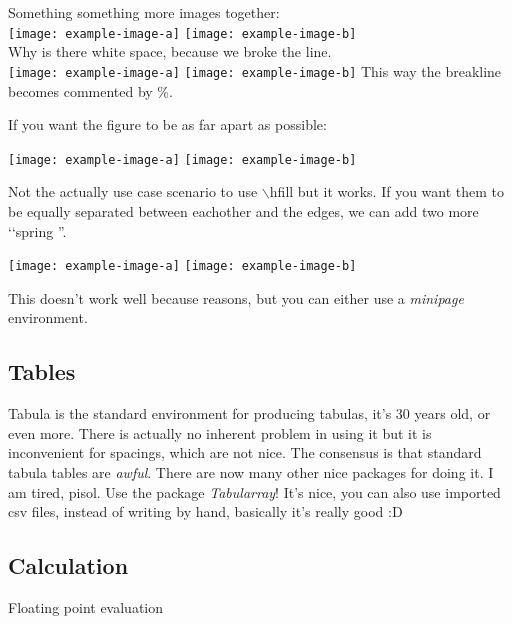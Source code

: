 \documentclass[]{article}
\begin{document}
Something something more images together: \\

\texttt{[image: example-image-a]}
\texttt{[image: example-image-b]}
\\ Why is there white space, because we broke the line. \\
\texttt{[image: example-image-a]}%
\texttt{[image: example-image-b]}
This way the breakline becomes commented by \%.

If you want the figure to be as far apart as possible:

\begin{center}
    \texttt{[image: example-image-a]}\hfill
    \texttt{[image: example-image-b]}
\end{center}
Not the actually use case scenario to use \(\backslash\)hfill but it works.
If you want them to be equally separated between eachother and the edges, we can add two more \lq\lq spring ''.
\begin{center}
    \hfill
    \texttt{[image: example-image-a]}\hfill
    \texttt{[image: example-image-b]} \hfill
\end{center}
This doesn't work well because reasons, but you can either use a \emph{minipage} environment. \\

\subsection{Tables}
Tabula is the standard environment for producing tabulas, it's 30 years old, or even more.
There is actually no inherent problem in using it but it is inconvenient for spacings, which are not nice. The consensus is that standard tabula tables are \emph{awful}.
There are now many other nice packages for doing it. I am tired, pisol.
Use the package \emph{Tabularray}! It's nice, you can also use imported csv files, instead of writing by hand, basically it's really good :D \\

\subsection{Calculation}
Floating point evaluation 
\end{document}
